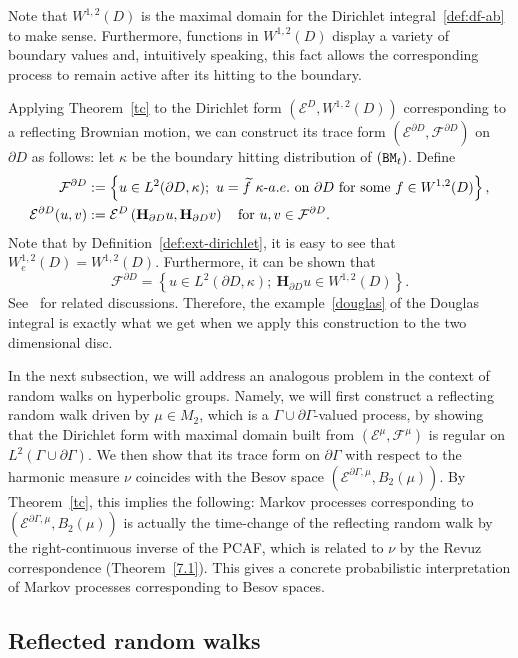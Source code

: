 \documentclass[10pt]{amsart}
\theoremstyle{definition}\newtheorem{defi}[theo]{Definition}\newtheorem{rema}[theo]{Remark}\newtheorem{exam}[theo]{Example}\newtheorem{exem}[theo]{Example}\newtheorem{nota}[theo]{Notation}
\newcommand{\ce}{\mathcal{E}}
\newcommand{\cf}{\mathcal{F}}
\newcommand{\bfH}{\mathbf{H}}
\let\oldtilde\tilde
\renewcommand*{\tilde}[1]{\mathchoice{\widetilde{#1}}{\widetilde{#1}}{\oldtilde{#1}}{\oldtilde{#1}}}
\begin{document}
Note that $W^{1,2}(D)$ is the maximal domain for the Dirichlet integral~\eqref{def:df-ab} to make sense. Furthermore, functions in $W^{1,2}(D)$ display a variety of boundary values and, intuitively speaking, this fact allows the corresponding process to remain active after its hitting to the boundary.

Applying Theorem~\ref{tc} to the Dirichlet form $(\ce^D, W^{1,2}(D))$ corresponding to a reflecting Brownian motion, we can construct its trace form $(\ce^{\partial D},
\cf^{\partial D})$ on $\partial D$ as follows: let $\kappa$ be the boundary hitting distribution of $({\tt BM}_t)$. Define
\begin{align}\label{eq:trace-bm}
\cf^{\partial D}&:=\left\{u\in L^2(\partial D,\kappa);\ u=\tilde{f}\ \kappa\text{-}a.e.\ \text{on}\ \partial D\ \text{for some}\ f\in W^{1,2}(D)\right\},\\
\ce^{\partial D}(u,v)&:=\ce^{D}\left(\bfH_{\partial D}u,\bfH_{\partial D}v\right)\quad\text{for}\ u,v\in \cf^{\partial D}.
\end{align}
Note that by Definition~\ref{def:ext-dirichlet}, it is easy to see that $W_e^{1,2}(D)=W^{1,2}(D)$. Furthermore, it can be shown that
\[
\cf^{\partial D}=\left\{u\in L^2(\partial D,\kappa);\ \bfH_{\partial D}u\in W^{1,2}(D)\right\}.
\]
See~\cite[Section~7.2, Example~7.2.10]{CF} for related discussions. Therefore, the example~\eqref{douglas} of the Douglas integral is exactly what we get when we apply this construction to the two dimensional disc.

In the next subsection, we will address an analogous problem in the context of random walks on hyperbolic groups. Namely, we will first construct a reflecting random walk driven by $\mu\in M_2$, which is a $\Gamma\cup\partial\Gamma$-valued process, by showing that the Dirichlet form with maximal domain built from $(\ce^\mu,\cf^\mu)$ is regular on $L^2(\Gamma\cup\partial\Gamma)$. We then show that its trace form on $\partial\Gamma$ with respect to the harmonic measure $\nu$ coincides with the Besov space $(\ce^{\partial\Gamma,\mu},B_2(\mu))$. By Theorem~\ref{tc}, this implies the following: Markov processes corresponding to $(\ce^{\partial\Gamma,\mu},B_2(\mu))$ is actually the time-change of the reflecting random walk by the right-continuous inverse of the PCAF, which is related to $\nu$ by the Revuz correspondence (Theorem~\ref{7.1}). This gives a concrete probabilistic interpretation of Markov processes corresponding to Besov spaces.

\subsection{Reflected random walks}
\end{document}
